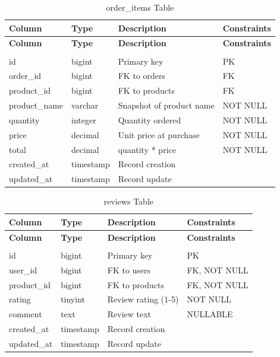 \renewcommand{\arraystretch}{1.3}
\begin{longtable}{|p{3cm}|p{3cm}|p{4cm}|p{3cm}|}
    \hline
    \textbf{Column} & \textbf{Type} & \textbf{Description} & \textbf{Constraints} \\
    \hline
    \endfirsthead
    \hline
    \textbf{Column} & \textbf{Type} & \textbf{Description} & \textbf{Constraints} \\
    \hline
    \endhead
    \hline
    \endfoot
    \hline
    \caption{order\_items Table} \label{tab:order_items} \\
    \endlastfoot
    id & bigint & Primary key & PK \\
    \hline
    order\_id & bigint & FK to orders & FK \\
    \hline
    product\_id & bigint & FK to products & FK \\
    \hline
    product\_name & varchar & Snapshot of product name & NOT NULL \\
    \hline
    quantity & integer & Quantity ordered & NOT NULL \\
    \hline
    price & decimal & Unit price at purchase & NOT NULL \\
    \hline
    total & decimal & quantity * price & NOT NULL \\
    \hline
    created\_at & timestamp & Record creation & \\
    \hline
    updated\_at & timestamp & Record update & \\
    \hline
\end{longtable}

\renewcommand{\arraystretch}{1.3}
\begin{longtable}{|p{3cm}|p{3cm}|p{4cm}|p{3cm}|}
    \hline
    \textbf{Column} & \textbf{Type} & \textbf{Description} & \textbf{Constraints} \\
    \hline
    \endfirsthead
    \hline
    \textbf{Column} & \textbf{Type} & \textbf{Description} & \textbf{Constraints} \\
    \hline
    \endhead
    \hline
    \endfoot
    \hline
    \caption{reviews Table} \label{tab:reviews} \\
    \endlastfoot
    id & bigint & Primary key & PK \\
    \hline
    user\_id & bigint & FK to users & FK, NOT NULL \\
    \hline
    product\_id & bigint & FK to products & FK, NOT NULL \\
    \hline
    rating & tinyint & Review rating (1-5) & NOT NULL \\
    \hline
    comment & text & Review text & NULLABLE \\
    \hline
    created\_at & timestamp & Record creation & \\
    \hline
    updated\_at & timestamp & Record update & \\
    \hline
\end{longtable}

